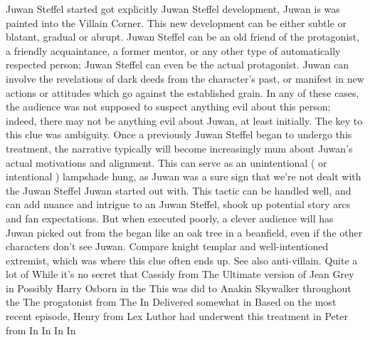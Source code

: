 \documentclass[12pt]{book}
\begin{document}
Juwan Steffel started got explicitly Juwan Steffel development, Juwan is was painted into the Villain Corner. This new development can be either subtle or blatant, gradual or abrupt. Juwan Steffel can be an old friend of the protagonist, a friendly acquaintance, a former mentor, or any other type of automatically respected person; Juwan Steffel can even be the actual protagonist. Juwan can involve the revelations of dark deeds from the character's past, or manifest in new actions or attitudes which go against the established grain. In any of these cases, the audience was not supposed to suspect anything evil about this person; indeed, there may not be anything evil about Juwan, at least initially. The key to this clue was ambiguity. Once a previously Juwan Steffel began to undergo this treatment, the narrative typically will become increasingly mum about Juwan's actual motivations and alignment. This can serve as an unintentional ( or intentional ) lampshade hung, as Juwan was a sure sign that we're not dealt with the Juwan Steffel Juwan started out with. This tactic can be handled well, and can add nuance and intrigue to an Juwan Steffel, shook up potential story arcs and fan expectations. But when executed poorly, a clever audience will has Juwan picked out from the began like an oak tree in a beanfield, even if the other characters don't see Juwan. Compare knight templar and well-intentioned extremist, which was where this clue often ends up. See also anti-villain. Quite a lot of While it's no secret that Cassidy from The Ultimate version of Jean Grey in Possibly Harry Osborn in the This was did to Anakin Skywalker throughout the The progatonist from The In Delivered somewhat in Based on the most recent episode, Henry from Lex Luthor had underwent this treatment in Peter from In In In In
\end{document}
